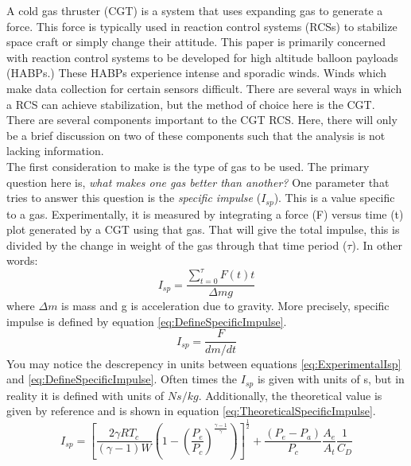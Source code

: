 A cold gas thruster (CGT) is a system that uses expanding gas to generate a force. This force is typically used in reaction control systems (RCSs) to stabilize space craft or simply change their attitude. This paper is primarily concerned with reaction control systems to be developed for high altitude balloon payloads (HABPs.) These HABPs experience intense and sporadic winds. Winds which make data collection for certain sensors difficult. There are several ways in which a RCS can achieve stabilization, but the method of choice here is the CGT.\\
There are several components important to the CGT RCS. Here, there will only be a brief discussion on two of these components such that the analysis is not lacking information. \\
The first consideration to make is the type of gas to be used. The primary question here is, \textit{what makes one gas better than another?} One parameter that tries to answer this question is the \textit{specific impulse} ($I_{sp}$). This is a value specific to a gas. Experimentally, it is measured by integrating a force (F) versus time (t) plot generated by a CGT using that gas. That will give the total impulse, this is divided by the change in weight of the gas through that time period ($\tau$). In other words:
\begin{equation}\label{eq:ExperimentalIsp}
I_{sp}=\frac{\sum\limits_{t=0}^{\tau} F(t)t}{\Delta mg}
\end{equation}%
%
%
%
%
%
%
where $\Delta m$ is mass and g is acceleration due to gravity. More precisely, specific impulse is defined by  equation \ref{eq:DefineSpecificImpulse}.
\begin{equation}\label{eq:DefineSpecificImpulse}
I_{sp}=\frac{F}{dm/dt}
\end{equation}
You may notice the descrepency in units between equations \ref{eq:ExperimentalIsp} and \ref{eq:DefineSpecificImpulse}. Often times the $I_{sp}$ is given with units of s, but in reality it is defined with units of $Ns/kg$. Additionally, the theoretical value is given by reference \cite{RocketPropulsion} and is shown in equation \ref{eq:TheoreticalSpecificImpulse}.
\begin{equation}\label{eq:TheoreticalSpecificImpulse}
I_{sp}=\left[\frac{2\gamma R T_c}{(\gamma-1)W}\left(1-\left(\frac{P_e}{P_c}\right)^{\frac{\gamma-1}{\gamma}}\right)\right]^{\frac{1}{2}}+\frac{(P_e-P_a)}{P_c}\frac{A_e}{A_t}\frac{1}{C_D}
\end{equation}
